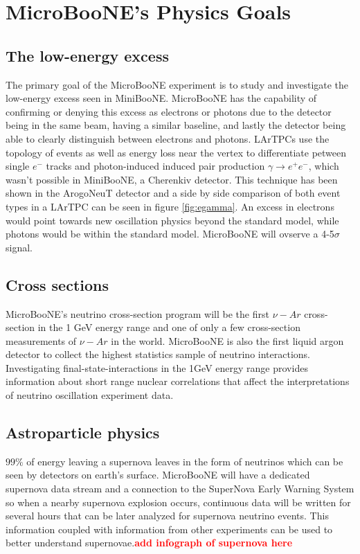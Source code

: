 \section{MicroBooNE's Physics Goals} 
\subsection{The low-energy excess}
The primary goal of the MicroBooNE experiment is to study and investigate the low-energy excess seen in MiniBooNE. MicroBooNE has the capability of confirming or denying this excess as electrons or photons due to the detector being in the same beam, having a similar baseline, and lastly the detector being able to clearly distinguish between electrons and photons. LArTPCs use the topology of events as well as energy loss near the vertex to differentiate petween single $e^-$ tracks and photon-induced induced pair production $\gamma \rightarrow e^+e^-$, which wasn't possible in MiniBooNE, a Cherenkiv detector. This technique has been shown in the ArogoNeuT detector\cite{argoneut} and a side by side comparison of both event types in a LArTPC can be seen in figure \ref{fig:egamma}. An excess in electrons would point towards new oscillation physics beyond the standard model, while photons would be within the standard model. MicroBooNE will ovserve a 4-5$\sigma$ signal.  
\subsection{Cross sections}
MicroBooNE's neutrino cross-section program will be the first $\nu-Ar$ cross-section in the 1 GeV energy range and one of only a few cross-section measurements of $\nu-Ar$ in the world. MicroBooNE is also the first liquid argon detector to collect the highest statistics sample of neutrino interactions. Investigating final-state-interactions in the 1GeV energy range provides information about short range nuclear correlations that affect the interpretations of neutrino oscillation experiment data. 
\subsection{Astroparticle physics}
$99\%$ of energy leaving a supernova leaves in the form of neutrinos which can be seen by detectors on earth's surface. MicroBooNE will have a dedicated supernova data stream and a connection to the SuperNova Early Warning System \cite{snews} so when a nearby supernova explosion occurs, continuous data will be written for several hours that can be later analyzed for supernova neutrino events. This information coupled with information from other experiments can be used to better understand supernovae.\textcolor{red}{\textbf{add infograph of supernova here}}

